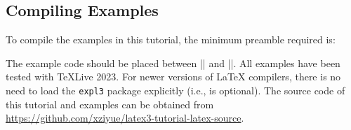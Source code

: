
\subsection{Compiling Examples}

To compile the examples in this tutorial, the minimum preamble required is:
\noindent The example code should be placed between \inltex|| and \inltex||. 
All examples have been tested with \TeX Live 2023.
For newer versions of \LaTeX{} compilers, there is no need to load the \verb|expl3| package explicitly (i.e.,  is optional).
The source code of this tutorial and examples can be obtained from \url{https://github.com/xziyue/latex3-tutorial-latex-source}.